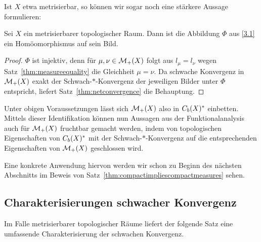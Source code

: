 \documentclass[../main/main.tex]{subfiles}
\begin{document}
	Ist $X$ etwa metrisierbar, so können wir sogar noch eine stärkere Aussage formulieren:
	
	\begin{Hilfssatz}
		Sei $X$ ein metrisierbarer topologischer Raum. Dann ist die Abbildung $\Phi$ aus \eqref{3.1} ein Homöomorphismus auf sein Bild.
	\end{Hilfssatz}

	\begin{proof}
		$\Phi$ ist injektiv, denn für $\mu, \nu \in \mathcal{M}_{+}(X)$ folgt aus $l_\mu = l_\nu$ wegen Satz~\ref{thm:measureequality} die Gleichheit $\mu = \nu$. 
		Da schwache Konvergenz in $\mathcal{M}_{+}(X)$ exakt der Schwach-$\ast$-Konvergenz der jeweiligen Bilder unter $\Phi$ entspricht, liefert Satz~\ref{thm:netconvergence}
		die Behauptung.
	\end{proof}

	Unter obigen Voraussetzungen lässt sich $\mathcal{M}_{+}(X)$ also in $C_b(X)^\ast$ einbetten. Mittels dieser Identifikation können nun Aussagen aus der 
	Funktionalanalysis auch für $\mathcal{M}_{+}(X)$ fruchtbar gemacht werden, indem von topologischen Eigenschaften von
	$C_b(X)^\ast$ mit der Schwach-$\ast$-Konvergenz auf die entsprechenden Eigenschaften von 
	$\mathcal{M}_{+}(X)$ geschlossen wird. 
	
	Eine konkrete Anwendung hiervon werden wir schon zu Beginn des nächsten Abschnitts im Beweis von Satz~\ref{thm:compactimpliescompactmeasures} sehen.
	
	\subsection{Charakterisierungen schwacher Konvergenz}
	\label{subsec:CharakterisierungenSchwacherKonvergenz}
	
	Im Falle metrisierbarer topologischer Räume liefert der folgende Satz eine umfassende Charakterisierung der schwachen Konvergenz.
	
\end{document}
